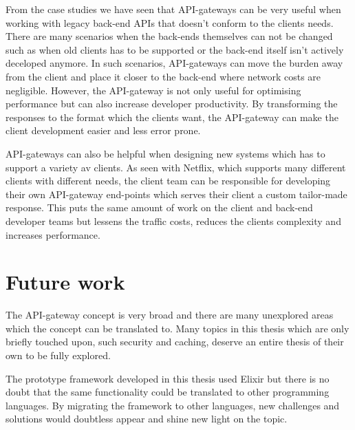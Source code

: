 \documentclass{cslthse-msc}
\begin{document}
From the case studies we have seen that API-gateways can be very useful when working with legacy back-end APIs that doesn't conform to the clients needs. There are many scenarios when the back-ends themselves can not be changed such as when old clients has to be supported or the back-end itself isn't actively deceloped anymore. In such scenarios, API-gateways can move the burden away from the client and place it closer to the back-end where network costs are negligible. However, the API-gateway is not only useful for optimising performance but can also increase developer productivity. By transforming the responses to the format which the clients want, the API-gateway can make the client development easier and less error prone.

API-gateways can also be helpful when designing new systems which has to support a variety av clients. As seen with Netflix\cite{netflix}, which supports many different clients with different needs, the client team can be responsible for developing their own API-gateway end-points which serves their client a custom tailor-made response. This puts the same amount of work on the client and back-end developer teams but lessens the traffic costs, reduces the clients complexity and increases performance.

\section{Future work}

The API-gateway concept is very broad and there are many unexplored areas which the concept can be translated to. Many topics in this thesis which are only briefly touched upon, such security and caching, deserve an entire thesis of their own to be fully explored.

The prototype framework developed in this thesis used Elixir but there is no doubt that the same functionality could be translated to other programming languages. By migrating the framework to other languages, new challenges and solutions would doubtless appear and shine new light on the topic. 

\cleardoublepage
{}
{}


\end{document}
